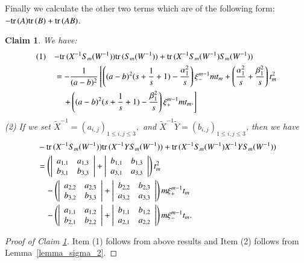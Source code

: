 \documentclass[a4paper]{amsart}
\theoremstyle{plain}
\newtheorem{claim}[theorem]{Claim}
\theoremstyle{definition}
\theoremstyle{remark}
\newcommand{\trace}{{\rm tr}\,}
\begin{document}
Finally we calculate the other two terms 
which are of the following form: $-\trace(A)\trace(B) + \trace(AB)$.
\begin{claim}\label{trAB-trAtrB}
We have:
\begin{align*}
(1)\quad\lefteqn{
-\trace(X^{-1}S_m(W^{-1}))\trace(S_m(W^{-1}))
+\trace(X^{-1}S_m(W^{-1})S_m(W^{-1}))
}
& \\
&=
- \frac{1}{(a-b)^2}
\left[
\left(
(a-b)^2(s+\frac{1}{s}+1) -\frac{\alpha^2_1}{s} 
\right)\xi_{-}^{m-1} m t_m
+\left(
\frac{\alpha^2_1}{s} + \frac{\beta^2_1}{s} 
\right)t^2_m \right.\\
& \left.\quad+\left(
(a-b)^2(s+\frac{1}{s}+1) -\frac{\beta^2_1}{s} 
\right)\xi_{+}^{m-1} m t_m.
\right]
\end{align*}
(2) If we set $\tilde X^{-1}={(a_{i, j})}_{1\leq i, j \leq 3},$ and  $\tilde X^{-1} \tilde Y={(b_{i, j})}_{1 \leq i, j \leq 3}$,
then we have
\begin{align*}
&
-\trace(X^{-1}S_m(W^{-1}))\trace(X^{-1} Y S_m(W^{-1}))
+\trace(X^{-1}S_m(W^{-1})X^{-1} Y S_m(W^{-1}))
\\
&=
\left(
    \left|
    \begin{array}{cc}
    a_{1, 1} & a_{1, 3} \\
    b_{3, 1} & b_{3, 3}
    \end{array}
    \right|
    +
    \left|
    \begin{array}{cc}
    b_{1, 1} & b_{1, 3} \\
    a_{3, 1} & a_{3, 3} 
    \end{array}
    \right|
\right)
t^2_m \\
& \quad -
\left(
    \left|
    \begin{array}{cc}
    a_{2, 2} & a_{2, 3} \\
    b_{3, 2} & b_{3, 3}
    \end{array}
    \right|
    +
    \left|
    \begin{array}{cc}
    b_{2, 2} & b_{2, 3} \\
    a_{3, 2} & a_{3, 3} 
    \end{array}
    \right|
\right)m 
\xi_{+}^{m-1} t_m \\
& \quad -
\left(
    \left|
    \begin{array}{cc}
    a_{1, 1} & a_{1, 2} \\
    b_{2, 1} & b_{2, 2}
    \end{array}
    \right|
    +
    \left|
    \begin{array}{cc}
    b_{1, 1} & b_{1, 2} \\
    a_{2, 1} & a_{2, 2} 
    \end{array}
    \right|
\right)
m \xi_{-}^{m-1}t_m.
\end{align*}
\end{claim}
\begin{proof}[Proof of Claim \ref{trAB-trAtrB}]
Item (1) follows from above results and Item (2) follows from Lem\-ma~\ref{lemma_sigma_2}.
\end{proof}
\end{document}
